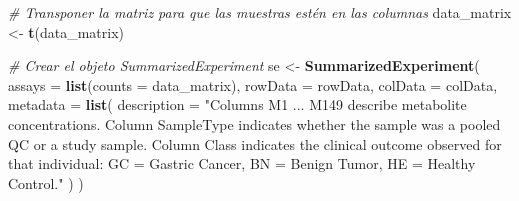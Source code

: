 \documentclass[
]{article}
\newenvironment{Shaded}{\begin{snugshade}}{\end{snugshade}}
\newcommand{\AttributeTok}[1]{\textcolor[rgb]{0.13,0.29,0.53}{#1}}
\newcommand{\CommentTok}[1]{\textcolor[rgb]{0.56,0.35,0.01}{\textit{#1}}}
\newcommand{\FunctionTok}[1]{\textcolor[rgb]{0.13,0.29,0.53}{\textbf{#1}}}
\newcommand{\NormalTok}[1]{#1}
\newcommand{\OtherTok}[1]{\textcolor[rgb]{0.56,0.35,0.01}{#1}}
\newcommand{\SpecialCharTok}[1]{\textcolor[rgb]{0.81,0.36,0.00}{\textbf{#1}}}
\newcommand{\StringTok}[1]{\textcolor[rgb]{0.31,0.60,0.02}{#1}}
\begin{document}
\begin{Shaded}
\begin{Highlighting}[]
\CommentTok{\# Transponer la matriz para que las muestras estén en las columnas}
\NormalTok{data\_matrix }\OtherTok{\textless{}{-}} \FunctionTok{t}\NormalTok{(data\_matrix)}
\end{Highlighting}
\end{Shaded}

\begin{Shaded}
\end{Shaded}

\begin{Shaded}
\end{Shaded}

\begin{Shaded}
\begin{Highlighting}[]
\CommentTok{\# Crear el objeto SummarizedExperiment}
\NormalTok{se }\OtherTok{\textless{}{-}} \FunctionTok{SummarizedExperiment}\NormalTok{(}
    \AttributeTok{assays =} \FunctionTok{list}\NormalTok{(}\AttributeTok{counts =}\NormalTok{ data\_matrix),}
    \AttributeTok{rowData =}\NormalTok{ rowData,}
    \AttributeTok{colData =}\NormalTok{ colData,}
    \AttributeTok{metadata =} \FunctionTok{list}\NormalTok{(}
        \AttributeTok{description =} \StringTok{"Columns M1 ... M149 describe metabolite concentrations. Column SampleType indicates whether the sample was a pooled QC or a study sample. Column Class indicates the clinical outcome observed for that individual: GC = Gastric Cancer, BN = Benign Tumor, HE = Healthy Control."}
\NormalTok{    )}
\NormalTok{)}
\end{Highlighting}
\end{Shaded}
\end{document}
